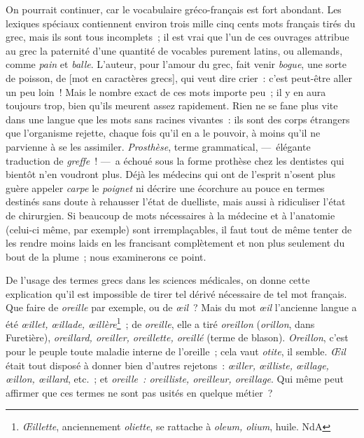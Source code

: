 \documentclass[french,twoside]{book} %
\begin{document}
\noindent On pourrait continuer, car le vocabulaire gréco-français est fort abondant. Les lexiques spéciaux contiennent environ trois mille cinq cents mots français tirés du grec, mais ils sont tous incomplets ; il est vrai que l’un de ces ouvrages attribue au grec la paternité d’une quantité de vocables purement latins, ou allemands, comme {\itshape pain} et {\itshape balle}. L’auteur, pour l’amour du grec, fait venir {\itshape bogue}, une sorte de poisson, de [mot en caractères grecs], qui veut dire crier : c’est peut-être aller un peu loin ! Mais le nombre exact de ces mots importe peu ; il y en aura toujours trop, bien qu’ils meurent assez rapidement. Rien ne se fane plus vite dans une langue que les mots sans racines vivantes : ils sont des corps étrangers que l’organisme rejette, chaque fois qu’il en a le pouvoir, à moins qu’il ne parvienne à se les assimiler. {\itshape Prosthèse}, terme grammatical, — élégante traduction de {\itshape greffe} ! — a échoué sous la forme prothèse chez les dentistes qui bientôt n’en voudront plus. Déjà les médecins qui ont de l’esprit n’osent plus guère appeler {\itshape carpe} le {\itshape poignet} ni décrire une écorchure au pouce en termes destinés sans doute à rehausser l’état de duelliste, mais aussi à ridiculiser l’état de chirurgien. Si beaucoup de mots nécessaires à la médecine et à l’anatomie (celui-ci même, par exemple) sont irremplaçables, il faut tout de même tenter de les rendre moins laids en les francisant complètement et non plus seulement du bout de la plume ; nous examinerons ce point.\par
De l’usage des termes grecs dans les sciences médicales, on donne cette explication qu’il est impossible de tirer tel dérivé nécessaire de tel mot français. Que faire de {\itshape oreille} par exemple, ou de {\itshape œil} ? Mais du mot {\itshape œil} l’ancienne langue a été {\itshape œillet, œillade, œillère}\footnote{{\itshape Œillette}, anciennement {\itshape oliette}, se rattache à {\itshape oleum, olium}, huile. NdA} ; de {\itshape oreille}, elle a tiré {\itshape oreillon} ({\itshape orillon}, dans Furetière), {\itshape oreillard, oreiller, oreillette, oreillé} (terme de blason). {\itshape Oreillon}, c’est pour le peuple toute maladie interne de l’oreille ; cela vaut {\itshape otite}, il semble. {\itshape Œil} était tout disposé à donner bien d’autres rejetons : {\itshape œiller, œilliste, œillage, œillon, œillard}, etc. ; et {\itshape oreille : oreilliste, oreilleur, oreillage}. Qui même peut affirmer que ces termes ne sont pas usités en quelque métier ?\par
\end{document}
